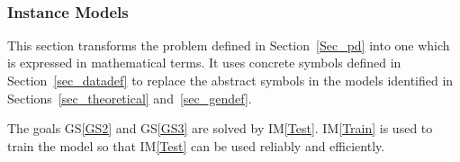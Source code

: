 \documentclass[12pt]{article}
\newcommand{\gsref}[1]{GS\ref{#1}}
\newcommand{\iref}[1]{IM\ref{#1}}
\begin{document}
~\newline
\subsubsection{Instance Models} \label{sec_instance}    

This section transforms the problem defined in Section~\ref{Sec_pd} into 
one which is expressed in mathematical terms. It uses concrete symbols defined 
in Section~\ref{sec_datadef} to replace the abstract symbols in the models 
identified in Sections~\ref{sec_theoretical} and~\ref{sec_gendef}.

The goals \gsref{GS2} and \gsref{GS3} are solved by \iref{Test}. \iref{Train} is used 
to train the model so that \iref{Test} can be used reliably and efficiently.

~\newline

\end{document}

